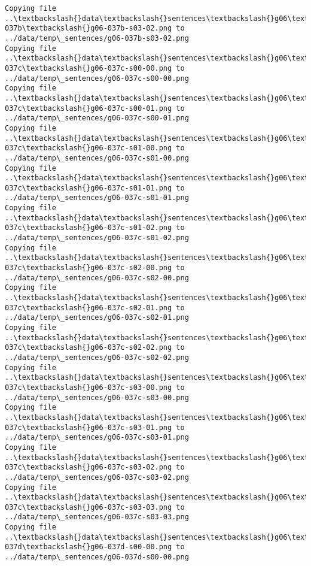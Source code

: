 \documentclass[11pt]{article}
\begin{document}
\begin{Verbatim}[commandchars=\\\{\}]
Copying file ..\textbackslash{}data\textbackslash{}sentences\textbackslash{}g06\textbackslash{}g06-037b\textbackslash{}g06-037b-s03-02.png to
../data/temp\_sentences/g06-037b-s03-02.png
Copying file ..\textbackslash{}data\textbackslash{}sentences\textbackslash{}g06\textbackslash{}g06-037c\textbackslash{}g06-037c-s00-00.png to
../data/temp\_sentences/g06-037c-s00-00.png
Copying file ..\textbackslash{}data\textbackslash{}sentences\textbackslash{}g06\textbackslash{}g06-037c\textbackslash{}g06-037c-s00-01.png to
../data/temp\_sentences/g06-037c-s00-01.png
Copying file ..\textbackslash{}data\textbackslash{}sentences\textbackslash{}g06\textbackslash{}g06-037c\textbackslash{}g06-037c-s01-00.png to
../data/temp\_sentences/g06-037c-s01-00.png
Copying file ..\textbackslash{}data\textbackslash{}sentences\textbackslash{}g06\textbackslash{}g06-037c\textbackslash{}g06-037c-s01-01.png to
../data/temp\_sentences/g06-037c-s01-01.png
Copying file ..\textbackslash{}data\textbackslash{}sentences\textbackslash{}g06\textbackslash{}g06-037c\textbackslash{}g06-037c-s01-02.png to
../data/temp\_sentences/g06-037c-s01-02.png
Copying file ..\textbackslash{}data\textbackslash{}sentences\textbackslash{}g06\textbackslash{}g06-037c\textbackslash{}g06-037c-s02-00.png to
../data/temp\_sentences/g06-037c-s02-00.png
Copying file ..\textbackslash{}data\textbackslash{}sentences\textbackslash{}g06\textbackslash{}g06-037c\textbackslash{}g06-037c-s02-01.png to
../data/temp\_sentences/g06-037c-s02-01.png
Copying file ..\textbackslash{}data\textbackslash{}sentences\textbackslash{}g06\textbackslash{}g06-037c\textbackslash{}g06-037c-s02-02.png to
../data/temp\_sentences/g06-037c-s02-02.png
Copying file ..\textbackslash{}data\textbackslash{}sentences\textbackslash{}g06\textbackslash{}g06-037c\textbackslash{}g06-037c-s03-00.png to
../data/temp\_sentences/g06-037c-s03-00.png
Copying file ..\textbackslash{}data\textbackslash{}sentences\textbackslash{}g06\textbackslash{}g06-037c\textbackslash{}g06-037c-s03-01.png to
../data/temp\_sentences/g06-037c-s03-01.png
Copying file ..\textbackslash{}data\textbackslash{}sentences\textbackslash{}g06\textbackslash{}g06-037c\textbackslash{}g06-037c-s03-02.png to
../data/temp\_sentences/g06-037c-s03-02.png
Copying file ..\textbackslash{}data\textbackslash{}sentences\textbackslash{}g06\textbackslash{}g06-037c\textbackslash{}g06-037c-s03-03.png to
../data/temp\_sentences/g06-037c-s03-03.png
Copying file ..\textbackslash{}data\textbackslash{}sentences\textbackslash{}g06\textbackslash{}g06-037d\textbackslash{}g06-037d-s00-00.png to
../data/temp\_sentences/g06-037d-s00-00.png

\end{Verbatim}
\end{document}
